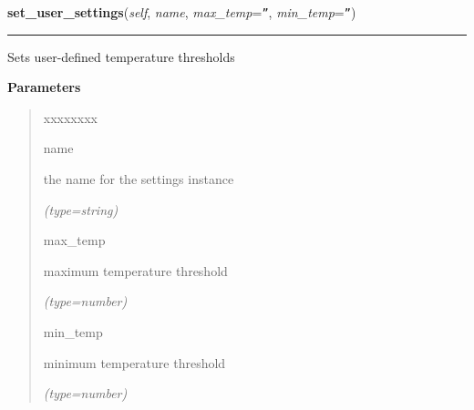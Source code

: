 \hspace{.8\funcindent}\begin{boxedminipage}{\funcwidth}

    \raggedright \textbf{set\_user\_settings}(\textit{self}, \textit{name}, \textit{max\_temp}={\tt ''}, \textit{min\_temp}={\tt ''})

    \vspace{-1.5ex}

    \rule{\textwidth}{0.5\fboxrule}
\setlength{\parskip}{2ex}
    Sets user-defined temperature thresholds

\setlength{\parskip}{1ex}
      \textbf{Parameters}
      \vspace{-1ex}

      \begin{quote}
        \begin{Ventry}{xxxxxxxx}

          \item[name]

          the name for the settings instance

            {\it (type=string)}

          \item[max\_temp]

          maximum temperature threshold

            {\it (type=number)}

          \item[min\_temp]

          minimum temperature threshold

            {\it (type=number)}

        \end{Ventry}

      \end{quote}

    \end{boxedminipage}

    \label{DBE:DBE:set_stat_data}

    \vspace{0.5ex}

